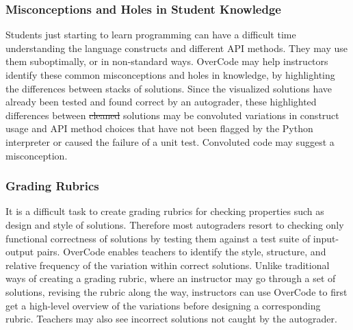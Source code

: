 \documentclass[12pt,twoside]{mitthesis}
\providecommand{\DIFaddtex}[1]{{\protect\color{blue}\uwave{#1}}} %
\providecommand{\DIFdeltex}[1]{{\protect\color{red}\sout{#1}}}                      %
\providecommand{\DIFaddbegin}{} %
\providecommand{\DIFaddend}{} %
\providecommand{\DIFdelbegin}{} %
\providecommand{\DIFdelend}{} %
\providecommand{\DIFadd}[1]{\texorpdfstring{\DIFaddtex{#1}}{#1}} %
\providecommand{\DIFdel}[1]{\texorpdfstring{\DIFdeltex{#1}}{}} %
\begin{document}
{{{{{{{{{{\DIFdelbegin %
\DIFdelend \DIFaddbegin \subsubsection{Misconceptions and Holes in Student Knowledge}
\DIFaddend Students just starting to learn programming can have a difficult time understanding the language constructs and different API methods. They may use them suboptimally, or in non-standard ways. OverCode may help instructors identify these common misconceptions and holes in knowledge, by highlighting the differences between stacks of solutions. Since the visualized solutions have already been tested and found correct by an autograder, these highlighted differences between \DIFdelbegin \DIFdel{cleaned }\DIFdelend \DIFaddbegin \DIFadd{platonic }\DIFaddend solutions may be convoluted variations in construct usage and API method choices that have not been flagged by the Python interpreter or caused the failure of a unit test. Convoluted code may suggest a misconception.

\DIFaddbegin {}

\DIFaddend \subsubsection{Grading Rubrics}
It is a difficult task to create grading rubrics for checking properties such as design and style of solutions. Therefore most autograders resort to checking only functional correctness of solutions by testing them against a test suite of input-output pairs. OverCode enables teachers to identify the style, structure, and relative frequency of the variation within correct solutions. Unlike traditional ways of creating a grading rubric, where an instructor may go through a set of solutions, revising the rubric along the way, instructors can use OverCode to first get a high-level overview of the variations before designing a corresponding rubric. Teachers may also see incorrect solutions not caught by the autograder.

}}}}}}}}}}
\end{document}
